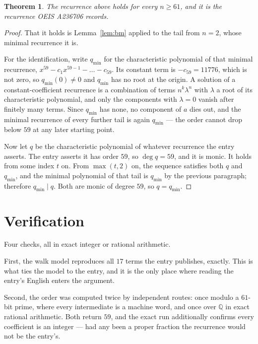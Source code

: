 \documentclass[11pt,a4paper]{article}
\theoremstyle{plain}
\newtheorem{theorem}{Theorem}
\theoremstyle{definition}
\begin{document}
\begin{theorem}
The recurrence above holds for every $n\ge61$, and it is the recurrence OEIS A236706 records.
\end{theorem}

\begin{proof}
That it holds is Lemma~\ref{lem:bm} applied to the tail from $n=2$, whose minimal
recurrence it is.

For the identification, write $q_{\min}$ for the characteristic polynomial of that minimal
recurrence, $x^{59}-c_1x^{59-1}-\dots-c_{59}$. Its constant term is
$-c_{59}=11776$, which is not zero, so $q_{\min}(0)\neq0$ and $q_{\min}$ has no
root at the origin. A solution of a constant-coefficient recurrence is a combination of terms
$n^{k}\lambda^{n}$ with $\lambda$ a root of its characteristic polynomial, and only the
components with $\lambda=0$ vanish after finitely many terms. Since $q_{\min}$ has none, no
component of $a$ dies out, and the minimal recurrence of every further tail is again
$q_{\min}$ --- the order cannot drop below $59$ at any later starting point.

Now let $q$ be the characteristic polynomial of whatever recurrence the entry asserts. The
entry asserts it has order $59$, so $\deg q=59$, and it is monic. It holds from some
index $t$ on. From $\max(t,2)$ on, the sequence satisfies both $q$ and $q_{\min}$, and
the minimal polynomial of that tail is $q_{\min}$ by the previous paragraph; therefore
$q_{\min}\mid q$. Both are monic of degree $59$, so $q=q_{\min}$.
\end{proof}

\section{Verification}

Four checks, all in exact integer or rational arithmetic.

First, the walk model reproduces all $17$ terms the entry publishes, exactly. This is
what ties the model to the entry, and it is the only place where reading the entry's English
enters the argument.

Second, the order was computed twice by independent routes: once modulo a $61$-bit prime, where
every intermediate is a machine word, and once over $\mathbb{Q}$ in exact rational arithmetic.
Both return $59$, and the exact run additionally confirms every coefficient is an integer
--- had any been a proper fraction the recurrence would not be the entry's.
\end{document}
